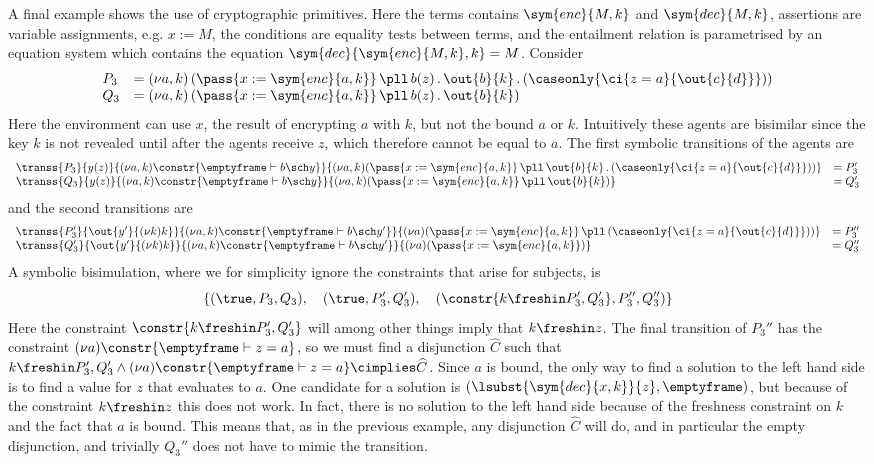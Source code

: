 \documentclass{eptcs}
\theoremstyle{definition}
\begin{document}
A final example shows the use of cryptographic primitives. Here
 the terms contains $\sym{enc}{M,k}$ and $\sym{dec}{M,k}$,
assertions are variable assignments, e.g. $x := M$, the conditions are
equality tests between terms, and the entailment relation is parametrised by an
equation system which contains the equation $\sym{dec}{\sym{enc}{M,k},k}=M$. Consider
\[
\begin{array}{ll}
 P_3 &= (\nu a,k)\,(\pass{x := \sym{enc}{a,k}} \,\pll\,
b(z)\,.\,\out{b}{k}\,.\, (\caseonly{\ci{z=a}{\out{c}{d}}}))\\
 Q_3 &= (\nu a,k)\,(\pass{x := \sym{enc}{a,k}} \,\pll\,
b(z)\,.\,\out{b}{k})
\end{array}
\]
Here the environment can use $x$, the result of encrypting $a$ with $k$, but not the bound $a$ or $k$.
Intuitively these agents are bisimilar since the key $k$ is not revealed until
after the agents receive $z$, which therefore cannot be equal to $a$. The first
symbolic transitions of the agents are
\[
 \begin{array}{ll}
  \transs{P_3}{y(z)}{(\nu a,k)\constr{\emptyframe \vdash b
\sch y}}{(\nu a,k)(\pass{x := \sym{enc}{a,k}} \,\pll\,
\out{b}{k}\,.\,(\caseonly{\ci{z=a}{\out{c}{d}}}))} & = P_3'\\
   \transs{Q_3}{y(z)}{(\nu a,k)\constr{\emptyframe \vdash b
\sch y}}{(\nu a,k)(\pass{x := \sym{enc}{a,k}} \,\pll\, \out{b}{k})} & = Q_3'
 \end{array}
\]
and the second transitions are
\[
 \begin{array}{ll}
   \transs{P_3'}{\out{y'}{(\nu k)k}}{(\nu a,k)\constr{\emptyframe
\vdash b \sch
y'}}{(\nu a)(\pass{x := \sym{enc}{a,k}} \,\pll\,
(\caseonly{\ci{z=a}{\out{c}{d}}}))} & =
P_3''\\
   \transs{Q_3'}{\out{y'}{(\nu k)k}}{(\nu a,k)\constr{\emptyframe
\vdash b \sch
y'}}{(\nu a)(\pass{x := \sym{enc}{a,k}})} & = Q_3''
 \end{array}
\]
A symbolic
bisimulation, where we for simplicity ignore the constraints that arise for
subjects, is
\[
\{(\true,P_3, Q_3),\quad (\true, P_3', Q_3'),\quad (\constr{k\freshin P_3',Q_3'}, P_3'', Q_3'')\}
\]
Here the constraint $\constr{k \freshin P_3',Q_3'}$ will among other things imply
that $k \freshin z$. The final transition of $P_3''$
has the constraint
$(\nu a)\constr{\emptyframe \vdash z=a}$, so 
we must find a
disjunction $\widehat{C}$ such that
$k \freshin P_3',Q_3' \wedge (\nu a)\constr{\emptyframe \vdash z=a} \cimplies \widehat{C}$.
Since $a$ is bound, the only way to find a solution to
the left hand side is to find a value for $z$ that evaluates to $a$. One
candidate for a solution is $(\lsubst{\sym{dec}{x,k}}{z}, \emptyframe)$, but
because of the constraint $k \freshin z$ this does not work. In fact, 
there is no
solution to the left hand side because of the freshness
constraint on $k$ and the fact that $a$ is bound. This means that, as in the previous example, any
disjunction
$\widehat{C}$ will do, and in particular the empty disjunction, and trivially
$Q_3''$ does not have to mimic the transition.
\end{document}
